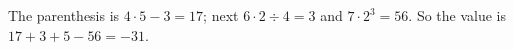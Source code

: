 The parenthesis is $4\cdot5-3=17$; next $6\cdot2\div4=3$ and $7\cdot2^3=56$. So the value is $17+3+5-56=\boxed{-31}$.
